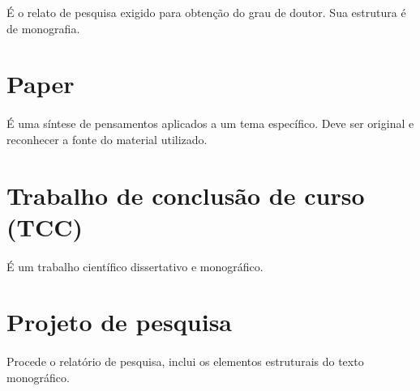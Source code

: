 É o relato de pesquisa exigido para obtenção do grau de doutor. Sua estrutura é de monografia.

\section{Paper}

\paragraph{}

É uma síntese de pensamentos aplicados a um tema específico. Deve ser original e reconhecer a fonte do material utilizado.

\section{Trabalho de conclusão de curso (TCC)}

\paragraph{}

É um trabalho científico dissertativo e monográfico.

\section{Projeto de pesquisa}

\paragraph{}

Procede o relatório de pesquisa, inclui os elementos estruturais do texto monográfico.